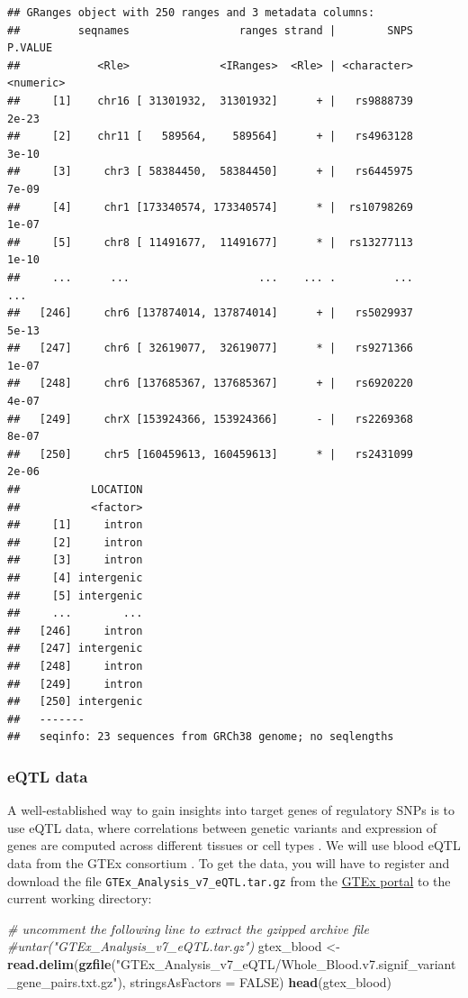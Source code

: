 \documentclass[9pt,a4paper,]{extarticle}
\newenvironment{Shaded}{\begin{snugshade}}{\end{snugshade}}
\newcommand{\KeywordTok}[1]{\textcolor[rgb]{0.13,0.29,0.53}{\textbf{#1}}}
\newcommand{\DataTypeTok}[1]{\textcolor[rgb]{0.13,0.29,0.53}{#1}}
\newcommand{\StringTok}[1]{\textcolor[rgb]{0.31,0.60,0.02}{#1}}
\newcommand{\CommentTok}[1]{\textcolor[rgb]{0.56,0.35,0.01}{\textit{#1}}}
\newcommand{\OtherTok}[1]{\textcolor[rgb]{0.56,0.35,0.01}{#1}}
\newcommand{\NormalTok}[1]{#1}
\begin{document}
\begin{verbatim}
## GRanges object with 250 ranges and 3 metadata columns:
##         seqnames                 ranges strand |        SNPS   P.VALUE
##            <Rle>              <IRanges>  <Rle> | <character> <numeric>
##     [1]    chr16 [ 31301932,  31301932]      + |   rs9888739     2e-23
##     [2]    chr11 [   589564,    589564]      + |   rs4963128     3e-10
##     [3]     chr3 [ 58384450,  58384450]      + |   rs6445975     7e-09
##     [4]     chr1 [173340574, 173340574]      * |  rs10798269     1e-07
##     [5]     chr8 [ 11491677,  11491677]      * |  rs13277113     1e-10
##     ...      ...                    ...    ... .         ...       ...
##   [246]     chr6 [137874014, 137874014]      + |   rs5029937     5e-13
##   [247]     chr6 [ 32619077,  32619077]      * |   rs9271366     1e-07
##   [248]     chr6 [137685367, 137685367]      + |   rs6920220     4e-07
##   [249]     chrX [153924366, 153924366]      - |   rs2269368     8e-07
##   [250]     chr5 [160459613, 160459613]      * |   rs2431099     2e-06
##           LOCATION
##           <factor>
##     [1]     intron
##     [2]     intron
##     [3]     intron
##     [4] intergenic
##     [5] intergenic
##     ...        ...
##   [246]     intron
##   [247] intergenic
##   [248]     intron
##   [249]     intron
##   [250] intergenic
##   -------
##   seqinfo: 23 sequences from GRCh38 genome; no seqlengths
\end{verbatim}

\subsubsection{eQTL data}\label{eqtl-data}

A well-established way to gain insights into target genes of regulatory SNPs is to use eQTL data, where correlations between genetic variants and expression of genes are computed across different tissues or cell types \citep{Albert2015}.
We will use blood eQTL data from the GTEx consortium \citep{GTEx2017}.
To get the data, you will have to register and download the file \texttt{GTEx\_Analysis\_v7\_eQTL.tar.gz} from the \href{https://www.gtexportal.org}{GTEx portal} to the current working directory:

\begin{Shaded}
\begin{Highlighting}[]
\CommentTok{# uncomment the following line to extract the gzipped archive file}
\CommentTok{#untar("GTEx_Analysis_v7_eQTL.tar.gz")}
\NormalTok{gtex_blood <-}\StringTok{ }\KeywordTok{read.delim}\NormalTok{(}\KeywordTok{gzfile}\NormalTok{(}\StringTok{"GTEx_Analysis_v7_eQTL/Whole_Blood.v7.signif_variant_gene_pairs.txt.gz"}\NormalTok{), }\DataTypeTok{stringsAsFactors =} \OtherTok{FALSE}\NormalTok{)}
\KeywordTok{head}\NormalTok{(gtex_blood)}
\end{Highlighting}
\end{Shaded}
\end{document}
